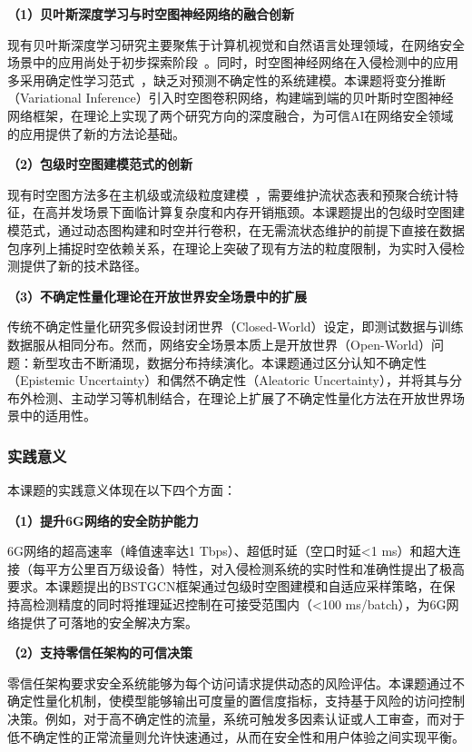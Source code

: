 \textbf{（1）贝叶斯深度学习与时空图神经网络的融合创新}

现有贝叶斯深度学习研究主要聚焦于计算机视觉和自然语言处理领域，在网络安全场景中的应用尚处于初步探索阶段~\cite{BCNN-IDS}。同时，时空图神经网络在入侵检测中的应用多采用确定性学习范式~\cite{E-ResGAT,TCG-IDS}，缺乏对预测不确定性的系统建模。本课题将变分推断（Variational Inference）引入时空图卷积网络，构建端到端的贝叶斯时空图神经网络框架，在理论上实现了两个研究方向的深度融合，为可信AI在网络安全领域的应用提供了新的方法论基础。

\textbf{（2）包级时空图建模范式的创新}

现有时空图方法多在主机级或流级粒度建模~\cite{EvolveGCN,PPT-GNN}，需要维护流状态表和预聚合统计特征，在高并发场景下面临计算复杂度和内存开销瓶颈。本课题提出的包级时空图建模范式，通过动态图构建和时空并行卷积，在无需流状态维护的前提下直接在数据包序列上捕捉时空依赖关系，在理论上突破了现有方法的粒度限制，为实时入侵检测提供了新的技术路径。

\textbf{（3）不确定性量化理论在开放世界安全场景中的扩展}

传统不确定性量化研究多假设封闭世界（Closed-World）设定，即测试数据与训练数据服从相同分布。然而，网络安全场景本质上是开放世界（Open-World）问题：新型攻击不断涌现，数据分布持续演化。本课题通过区分认知不确定性（Epistemic Uncertainty）和偶然不确定性（Aleatoric Uncertainty），并将其与分布外检测、主动学习等机制结合，在理论上扩展了不确定性量化方法在开放世界场景中的适用性。

\subsubsection{实践意义}

本课题的实践意义体现在以下四个方面：

\textbf{（1）提升6G网络的安全防护能力}

6G网络的超高速率（峰值速率达1 Tbps）、超低时延（空口时延<1 ms）和超大连接（每平方公里百万级设备）特性，对入侵检测系统的实时性和准确性提出了极高要求。本课题提出的BSTGCN框架通过包级时空图建模和自适应采样策略，在保持高检测精度的同时将推理延迟控制在可接受范围内（<100 ms/batch），为6G网络提供了可落地的安全解决方案。

\textbf{（2）支持零信任架构的可信决策}

零信任架构要求安全系统能够为每个访问请求提供动态的风险评估。本课题通过不确定性量化机制，使模型能够输出可度量的置信度指标，支持基于风险的访问控制决策。例如，对于高不确定性的流量，系统可触发多因素认证或人工审查，而对于低不确定性的正常流量则允许快速通过，从而在安全性和用户体验之间实现平衡。

